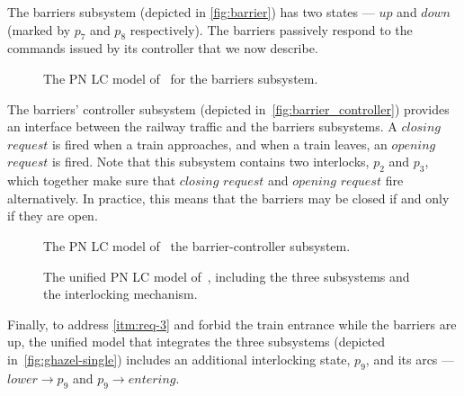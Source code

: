 \documentclass[10pt,journal,compsoc]{IEEEtran}
\theoremstyle{definition}
\begin{document}
The barriers subsystem (depicted in \autoref{fig:barrier}) has two states --- $\mathit{up}$ and $\mathit{down}$ (marked by $p_7$ and $p_8$ respectively). The barriers passively respond to the commands issued by its controller that we now describe.

\begin{figure}
  \centering
{}
  \caption{The PN LC model of~\cite{leveson1987safety} for the barriers subsystem.}
  \label{fig:barrier}
\end{figure}

The barriers' controller subsystem (depicted in~\autoref{fig:barrier_controller}) provides an interface between the railway traffic and the barriers subsystems. A $\mathit{closing}$ $\mathit{request}$ is fired when a train approaches, and when a train leaves, an $\mathit{opening}$ $\mathit{request}$ is fired. Note that this subsystem contains two interlocks, $p_2$ and $p_3$, which together make sure that $\mathit{closing}$ $\mathit{request}$ and $\mathit{opening}$ $\mathit{request}$ fire alternatively. In practice, this means that the barriers may be closed if and only if they are open.

\begin{figure}
  \centering
{}
  \caption{The PN LC model of~\cite{leveson1987safety} the barrier-controller subsystem.}
  \label{fig:barrier_controller}
\end{figure}

\begin{figure}
  \centering
{}
  \caption{The unified PN LC model of~\cite{leveson1987safety}, including the three subsystems and the interlocking mechanism.}
  \label{fig:ghazel-single} 
\end{figure}

Finally, to address \ref{itm:req-3} and forbid the train entrance while the barriers are up, the unified model that integrates the three subsystems (depicted in~\autoref{fig:ghazel-single}) includes an additional interlocking state, $p_9$, and its arcs --- $lower \rightarrow p_9$ and $p_9 \rightarrow entering$. 
\end{document}

